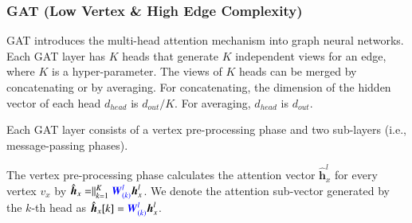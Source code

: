 \subsubsection{GAT (Low Vertex \& High Edge Complexity)}

GAT \cite{huang2018_gat} introduces the multi-head attention mechanism into graph neural networks.
%
Each GAT layer has $K$ heads that generate $K$ independent views for an edge, where $K$ is a hyper-parameter.
%
The views of $K$ heads can be merged by concatenating or by averaging.
%
For concatenating, the dimension of the hidden vector of each head $d_{head}$ is $d_{out}/K$.
%
For averaging, $d_{head}$ is $d_{out}$.

Each GAT layer consists of a vertex pre-processing phase and two sub-layers (i.e., message-passing phases).

The vertex pre-processing phase calculates the attention vector $\hat{\boldsymbol{h}}^{l}_{x}$ for every vertex $v_x$ by $\hat{\boldsymbol{h}}_{x} = \parallel_{k=1}^K \textcolor{blue}{\boldsymbol{W}^l_{(k)}}\boldsymbol{h}^l_x$. We denote the attention sub-vector generated by the $k$-th head as $\hat{\boldsymbol{h}}_{x}[k]=\textcolor{blue}{\boldsymbol{W}^l_{(k)}}\boldsymbol{h}^l_x$.


